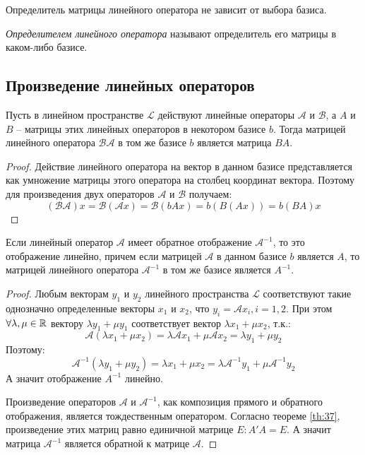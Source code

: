 \begin{consequence}
  Определитель матрицы линейного оператора не зависит от выбора базиса.
\end{consequence}

\begin{definition}
  \textit{Определителем линейного оператора} называют определитель его матрицы в каком-либо базисе.
\end{definition}

\subsection{Произведение линейных операторов}

\begin{theorem}
  \label{th:37}
  Пусть в линейном пространстве $\mathcal{L}$ действуют линейные операторы $\mathcal{A}$ и $\mathcal{B}$, а $A$ и $B$ -- матрицы этих линейных операторов в некотором базисе $b$. Тогда матрицей линейного оператора $\mathcal{BA}$ в том же базисе $b$ является матрица $BA$.
\end{theorem}
\begin{proof}
  Действие линейного оператора на вектор в данном базисе представляется как умножение матрицы этого оператора на столбец координат вектора. Поэтому для произведения двух операторов $\mathcal{A}$ и $\mathcal{B}$ получаем: \[
    \left( \mathcal{BA} \right) x = \mathcal{B}\left( \mathcal{A}x \right) = \mathcal{B}\left( b A x \right)  = b\left( B(Ax) \right) = b(BA)x
  \] 
\end{proof}

\begin{theorem}
  Если линейный оператор $\mathcal{A}$ имеет обратное отображение $\mathcal{A}^{-1}$, то это отображение линейно, причем если матрицей $\mathcal{A}$ в данном базисе $b$ является $A$, то матрицей линейного оператора $\mathcal{A}^{-1}$ в том же базисе является $A^{-1}$.
\end{theorem}
\begin{proof}
  Любым векторам $y_1$ и  $y_2$ линейного пространства $\mathcal{L}$ соответствуют такие однозначно определенные векторы $x_1$ и $x_2$, что  $y_i = \mathcal{A} x_i, i = 1,2$. При этом $\forall \lambda, \mu \in \mathbb{R}$ вектору $\lambda y_1 + \mu y_1$ соответствует вектор $\lambda x_1 + \mu x_2$, т.к.: \[
  \mathcal{A}\left( \lambda x_1 + \mu x_2 \right) = \lambda \mathcal{A} x_1 + \mu \mathcal{A} x_2 = \lambda y_1 + \mu y_2
  \] 
  Поэтому: \[
    \mathcal{A}^{-1} \left( \lambda y_1 + \mu y_2 \right) = \lambda x_1 + \mu x_2 = \lambda \mathcal{A}^{-1} y_1 + \mu \mathcal{A}^{-1} y_2
  \]
  А значит отображение $A^{-1}$ линейно.

  Произведение операторов $\mathcal{A}$ и $\mathcal{A}^{-1}$, как композиция прямого и обратного отображения, является тождественным оператором. Согласно теореме  \ref{th:37}, произведение этих матриц равно единичной матрице $E : A'A = E$. А значит матрица $\mathcal{A}^{-1}$ является обратной к матрице $\mathcal{A}$.
\end{proof}

